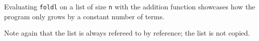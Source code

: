 Evaluating \texttt{foldl} on a list of size \texttt{n} with the addition function showcases how the program only grows by a constant number of terms.
\begin{remark}
	Note again that the list is always refereed to by reference; the list is not copied.
\end{remark}

